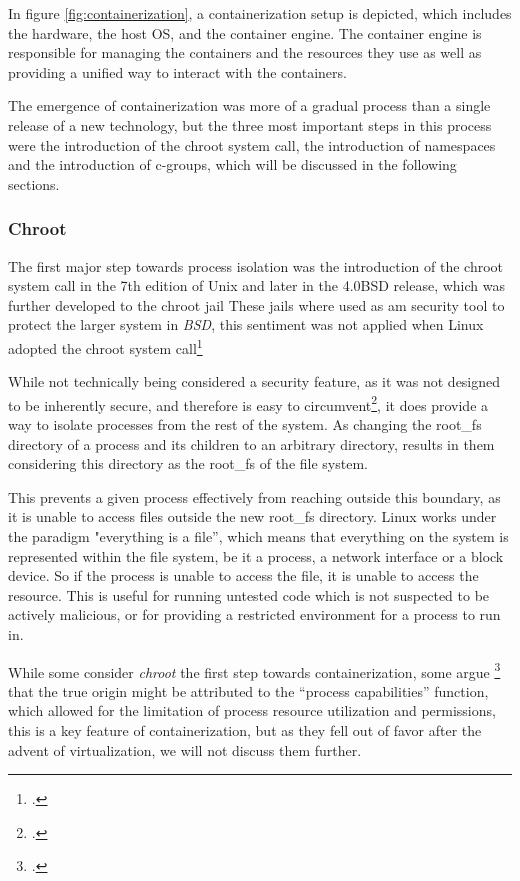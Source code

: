 In figure \ref{fig:containerization}, a containerization setup is depicted, which includes the hardware,
the \gls{host} \ac{OS}, and the container engine.
The container engine is responsible for managing the containers and the resources they use as well as providing a unified way to interact with the containers.

The emergence of containerization was more of a gradual process than a single release of a new technology,
but the three most important steps in this process were the introduction of the chroot system call,
the introduction of namespaces and the introduction of c-groups, which will be discussed in the following sections.

\subsubsection{Chroot}

The first major step towards process isolation was the introduction of the chroot system call in the 7th edition of Unix and later in the 4.0BSD release,
which was further developed to the chroot jail
These jails where used as am security tool to protect the larger system in \textit{BSD},
this sentiment was not applied when Linux adopted the chroot system call\footcite{bernsteinContainersCloudLXC2014}

While not technically being considered a security feature, as it was not designed to be inherently secure, and therefore is easy to circumvent\footcite{linux-manualpageChrootLinuxManual},
it does provide a way to isolate processes from the rest of the system.
As changing the \gls{root_fs} directory of a process and its children to an arbitrary directory, results in them considering this directory as the \gls{root_fs} of the file system.

This prevents a given process effectively from reaching outside this boundary, as it is unable to access files outside the new \gls{root_fs} directory.
Linux works under the paradigm  "everything is a file”, which means that everything on the system is represented within the file system,
be it a process, a network interface or a block device.
So if the process is unable to access the file, it is unable to access the resource.
This is useful for running untested code which is not suspected to be actively malicious, or for providing a restricted environment for a process to run in.

While some consider \textit{chroot} the first step towards containerization, some argue \footcite{randalIdealRealRevisiting2021} that the true origin might be attributed to the  “process capabilities” function,
which allowed for the limitation of process resource utilization and permissions, this is a key feature of containerization, but as they fell out of favor after the advent of virtualization, we will not discuss them further.

